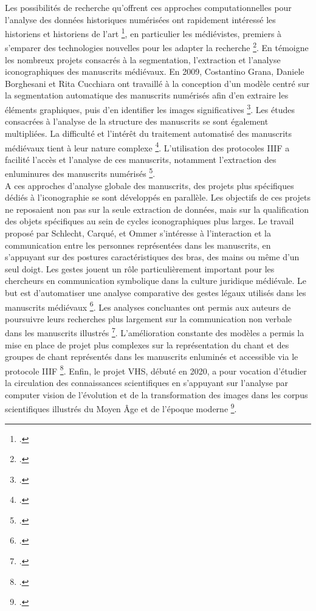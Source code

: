 \documentclass[12pt,twoside]{book}
\begin{document}
\newpage
Les possibilités de recherche qu’offrent ces approches computationnelles pour l’analyse des données historiques numérisées ont rapidement intéressé les historiens et historiens de l’art \footcite{ufer_large-scale_2021}, en particulier les médiévistes, premiers à s’emparer des technologies nouvelles pour les adapter la recherche \footcite{unsworth_medievalists_2012}. En témoigne les nombreux projets consacrés à la segmentation, l’extraction et l’analyse iconographiques des manuscrits médiévaux. En 2009, Costantino Grana, Daniele Borghesani et Rita Cucchiara ont travaillé à la conception d’un modèle centré sur la segmentation automatique des manuscrits numérisés afin d'en extraire les éléments graphiques, puis d'en identifier les images significatives \footcite{grana_picture_2009}. Les études consacrées à l’analyse de la structure des manuscrits se sont également multipliées. La difficulté et l’intérêt du traitement automatisé des manuscrits médiévaux tient à leur nature complexe \footcite{yang_automatic_2017}. L’utilisation des protocoles IIIF a facilité l’accès et l’analyse de ces manuscrits, notamment l’extraction des enluminures des manuscrits numérisés \footcite{aouinti_illumination_2022}. \\

A ces approches d’analyse globale des manuscrits, des projets plus spécifiques dédiés à l’iconographie se sont développés en parallèle. Les objectifs de ces projets ne reposaient non pas sur la seule extraction de données, mais sur la qualification des objets spécifiques au sein de cycles iconographiques plus larges. Le travail proposé par Schlecht, Carqué, et Ommer s’intéresse à l'interaction et la communication entre les personnes représentées dans les manuscrits, en s’appuyant sur des postures caractéristiques des bras, des mains ou même d'un seul doigt. Les gestes jouent un rôle particulièrement important pour les chercheurs en communication symbolique dans la culture juridique médiévale. Le but est d’automatiser une analyse comparative des gestes légaux utilisés dans les manuscrits médiévaux \footcite{schlecht_detecting_2011}. 
Les analyses concluantes ont permis aux auteurs de poursuivre leurs recherches plus largement sur la communication non verbale dans les manuscrits illustrés \enlargethispage{\baselineskip} \footcite{bell_nonverbal_2013}. L’amélioration constante des modèles a permis la mise en place de projet plus complexes sur la représentation du chant et des groupes de chant représentés dans les manuscrits enluminés et accessible via le protocole IIIF \footcite{ibrahim_few-shot_2022}. Enfin, le projet VHS, débuté en 2020, a pour vocation d’étudier la circulation des connaissances scientifiques en s’appuyant sur l’analyse par computer vision de l'évolution et de la transformation des images dans les corpus scientifiques illustrés du Moyen Âge et de l'époque moderne \footcite{noauthor_computer_nodate}. \\
\end{document}
